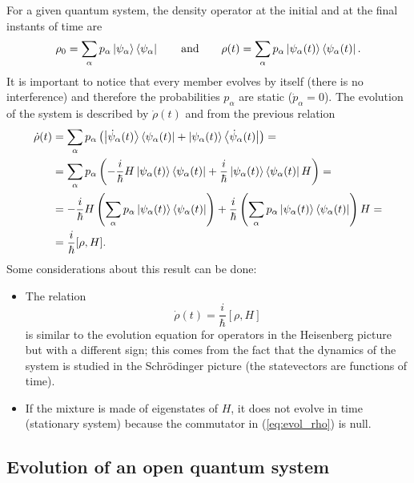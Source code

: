 For a given quantum system, the density operator at the initial and at the final instants of time are
\begin{align*}
    \rho_0 = \sum_\alpha p_\alpha \ket{\psi_\alpha} \bra{\psi_\alpha} \qquad \text{and} \qquad \rho(t) = \sum_\alpha p_\alpha \ket{\psi_\alpha(t)} \bra{\psi_\alpha(t)}.
\end{align*}
It is important to notice that every member evolves by itself (there is no interference) and therefore the probabilities $p_\alpha$ are static ($\dot{p}_\alpha = 0$). 
The evolution of the system is described by $\dot{\rho}(t)$ and from the previous relation 
\begin{align*}
    \dot{\rho}(t) &= \sum_\alpha p_\alpha \left( \ket{\dot{\psi}_\alpha(t)} \bra{\psi_\alpha(t)} + \ket{\psi_\alpha(t)} \bra{\dot{\psi}_\alpha(t)} \right) = \\
    &= \sum_\alpha p_\alpha \left( -\frac{i}{\hbar} H \ket{\psi_\alpha(t)} \bra{\psi_\alpha(t)} + \frac{i}{\hbar} \ket{\psi_\alpha(t)} \bra{\psi_\alpha(t)} H \right) = \\
    &= -\frac{i}{\hbar} H \left( \sum_\alpha p_\alpha \ket{\psi_\alpha(t)} \bra{\psi_\alpha(t)} \right) + \frac{i}{\hbar} \left( \sum_\alpha p_\alpha \ket{\psi_\alpha(t)} \bra{\psi_\alpha(t)} \right) H = \\
    &= \frac{i}{\hbar} [\rho,H].
\end{align*}
Some considerations about this result can be done:
\begin{itemize}
    \item The relation 
    \begin{equation}
        \label{eq:evol_rho}
        \dot{\rho}(t) = \frac{i}{\hbar} [\rho,H]
    \end{equation}
    is similar to the evolution equation for operators in the Heisenberg picture but with a different sign; this comes from the fact that the dynamics of the system is studied in the Schr\"odinger picture (the statevectors are functions of time). 
    \item If the mixture is made of eigenstates of $H$, it does not evolve in time (stationary system) because the commutator in (\ref{eq:evol_rho}) is null. 
\end{itemize}

\subsection{Evolution of an open quantum system}

